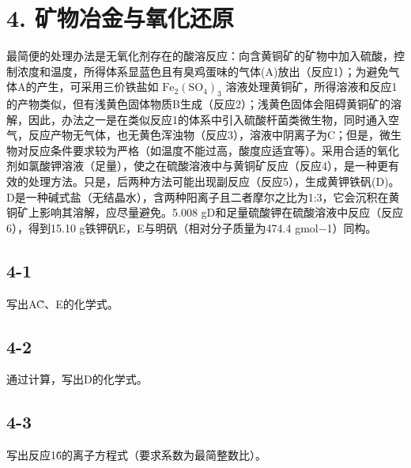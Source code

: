 \section*{4. 矿物冶金与氧化还原}
最简便的处理办法是⽆氧化剂存在的酸溶反应：向含⻩铜矿的矿物中加⼊硫酸，控制浓度和温度，所得体系显蓝⾊且有臭鸡蛋味的⽓体(A)放出（反应1）；为避免⽓体A的产⽣，可采⽤三价铁盐如 $\mathrm { F e _ { 2 } ( S O _ { 4 } ) _ { 3 } }$ 溶液处理⻩铜矿，所得溶液和反应1的产物类似，但有浅⻩⾊固体物质B⽣成（反应2）；浅⻩⾊固体会阻碍⻩铜矿的溶解，因此，办法之⼀是在类似反应1的体系中引⼊硫酸杆菌类微⽣物，同时通⼊空⽓，反应产物⽆⽓体，也⽆⻩⾊浑浊物（反应3），溶液中阴离⼦为C；但是，微⽣物对反应条件要求较为严格（如温度不能过⾼，酸度应适宜等）。采⽤合适的氧化剂如氯酸钾溶液（⾜量），使之在硫酸溶液中与⻩铜矿反应（反应4），是⼀种更有效的处理⽅法。只是，后两种⽅法可能出现副反应（反应5），⽣成⻩钾铁矾(D)。D是⼀种碱式盐（⽆结晶⽔），含两种阳离⼦且⼆者摩尔之⽐为1:3，它会沉积在⻩铜矿上影响其溶解，应尽量避免。5.008 gD和⾜量硫酸钾在硫酸溶液中反应（反应6），得到15.10 g铁钾矾E，E与明矾（相对分⼦质量为474.4 gmol−1）同构。

\subsection*{4-1}
写出A\~C、E的化学式。

\subsection*{4-2}
通过计算，写出D的化学式。

\subsection*{4-3}
写出反应1\~6的离⼦⽅程式（要求系数为最简整数⽐）。
